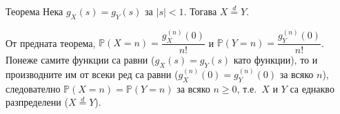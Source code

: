 \begin{thmbox}[]{Теорема}
Нека $g_X(s)=g_Y(s)$ за $|s|<1$. Тогава $X\stackrel{d}{=}Y$.
\end{thmbox}

\begin{proofbox}
От предната теорема, $\mathbb P(X=n)=\dfrac{g_X^{(n)}(0)}{n!}$ и
$\mathbb P(Y=n)=\dfrac{g_Y^{(n)}(0)}{n!}$. Понеже самите функции са
равни ($g_X(s)=g_Y(s)$ като функции), то и производните им от всеки
ред са равни ($g_X^{(n)}(0)=g_Y^{(n)}(0)$ за всяко $n$), следователно
$\mathbb P(X=n)=\mathbb P(Y=n)$ за всяко $n\ge0$, т.е.\ $X$ и $Y$ са
еднакво разпределени ($X\stackrel{d}{=}Y$). \qedbg
\end{proofbox}
